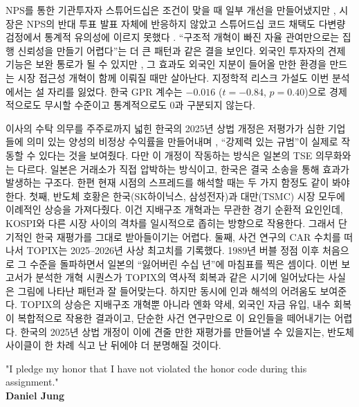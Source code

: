 \documentclass[12pt]{article}
\begin{document}
NPS를 통한 기관투자자 스튜어드십은 조건이 맞을 때 일부 개선을 만들어냈지만 \citep{kim2022nps_esg, lee2026esg}, 시장은 NPS의 반대 투표 발표 자체에 반응하지 않았고 \citep{kim2014nps} 스튜어드십 코드 채택도 다변량 검정에서 통계적 유의성에 이르지 못했다 \citep{park2021stewardship}. ``구조적 개혁이 빠진 자율 관여만으로는 집행 신뢰성을 만들기 어렵다''는 더 큰 패턴과 같은 결을 보인다. 외국인 투자자의 견제 기능은 보완 통로가 될 수 있지만 \citep{joo2026foreign, kim2015foreign}, 그 효과도 외국인 지분이 들어올 만한 환경을 만드는 시장 접근성 개혁이 함께 이뤄질 때만 살아난다. 지정학적 리스크 가설도 이번 분석에서는 설 자리를 잃었다. 한국 GPR 계수는 $-0.016$ ($t=-0.84$, $p=0.40$)으로 경제적으로도 무시할 수준이고 통계적으로도 0과 구분되지 않는다.

이사의 수탁 의무를 주주로까지 넓힌 한국의 2025년 상법 개정은 저평가가 심한 기업들에 의미 있는 양성의 비정상 수익률을 만들어내며 \citep{kang2026commercial}, ``강제력 있는 규범''이 실제로 작동할 수 있다는 것을 보여줬다. 다만 이 개정이 작동하는 방식은 일본의 TSE 의무화와는 다르다. 일본은 거래소가 직접 압박하는 방식이고, 한국은 결국 소송을 통해 효과가 발생하는 구조다. 한편 현재 시점의 스프레드를 해석할 때는 두 가지 함정도 같이 봐야 한다. 첫째, 반도체 호황은 한국(SK하이닉스, 삼성전자)과 대만(TSMC) 시장 모두에 이례적인 상승을 가져다줬다. 이건 지배구조 개혁과는 무관한 경기 순환적 요인인데, KOSPI와 다른 시장 사이의 격차를 일시적으로 좁히는 방향으로 작용한다. 그래서 단기적인 한국 재평가를 그대로 받아들이기는 어렵다. 둘째, 사건 연구의 CAR 수치를 떠나서 TOPIX는 2025--2026년 사상 최고치를 기록했다. 1989년 버블 정점 이후 처음으로 그 수준을 돌파하면서 일본의 ``잃어버린 수십 년''에 마침표를 찍은 셈이다. 이번 보고서가 분석한 개혁 시퀀스가 TOPIX의 역사적 회복과 같은 시기에 일어났다는 사실은 그림에 나타난 패턴과 잘 들어맞는다. 하지만 동시에 인과 해석의 어려움도 보여준다. TOPIX의 상승은 지배구조 개혁뿐 아니라 엔화 약세, 외국인 자금 유입, 내수 회복이 복합적으로 작용한 결과이고, 단순한 사건 연구만으로 이 요인들을 떼어내기는 어렵다. 한국의 2025년 상법 개정이 이에 견줄 만한 재평가를 만들어낼 수 있을지는, 반도체 사이클이 한 차례 식고 난 뒤에야 더 분명해질 것이다.

{\singlespacing


}

\begin{center}
    "I pledge my honor that I have not violated the honor code during this assignment."\\
    \vspace{0.5cm}
    \textbf{Daniel Jung}
\end{center}
\end{document}
